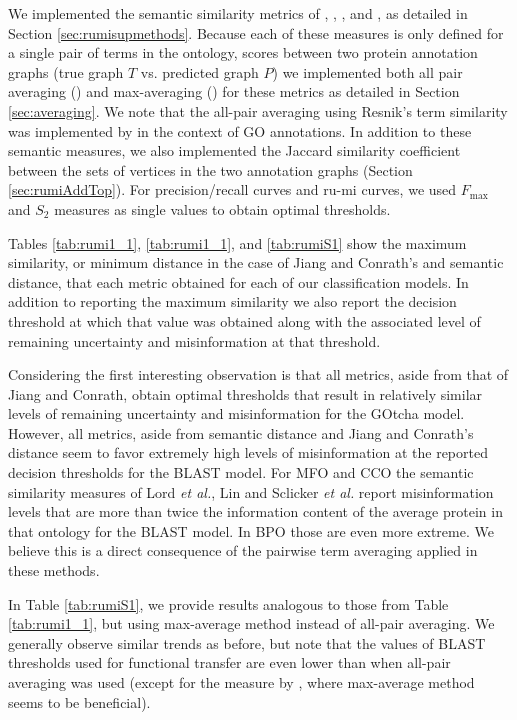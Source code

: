 We implemented the semantic similarity metrics of \cite{Resnik1995}, \cite{Jiang1997}, \cite{Lin1998}, and \cite{Schlicker2006}, as detailed in Section \ref{sec:rumisupmethods}. Because each of these measures is only defined for a single pair of terms in the ontology, scores between two protein annotation graphs (true graph $T$ vs. predicted graph $P$) we implemented both all pair averaging () and max-averaging () for these metrics as detailed in Section \ref{sec:averaging}. We note that the all-pair averaging using Resnik's term similarity was implemented by \citet{Lord2003} in the context of GO annotations. In addition to these semantic measures, we also implemented the Jaccard similarity coefficient between the sets of vertices in the two annotation graphs (Section \ref{sec:rumiAddTop}). For precision/recall curves and ru-mi curves, we used $F_{\max}$ and $S_{2}$ measures as single values to obtain optimal thresholds.

Tables \ref{tab:rumi1_1}, \ref{tab:rumi1_1}, and \ref{tab:rumiS1} show the maximum similarity, or minimum distance in the case of Jiang and Conrath's and semantic distance, that each metric obtained for each of our classification models. In addition to reporting the maximum similarity we also report the decision threshold at which that value was obtained along with the associated level of remaining uncertainty and misinformation at that threshold. 

Considering  the first interesting observation is that all metrics, aside from that of Jiang and Conrath, obtain optimal thresholds that result in relatively similar levels of remaining uncertainty and misinformation for the GOtcha model. However, all metrics, aside from semantic distance and Jiang and Conrath's distance seem to favor extremely high levels of misinformation at the reported decision thresholds for the BLAST model. For MFO and CCO the semantic similarity measures of Lord \emph{et al.}, Lin and Sclicker \emph{et al.} report misinformation levels that are more than twice the information content of the average protein in that ontology for the BLAST model. In BPO those are even more extreme. We believe this is a direct consequence of the pairwise term averaging applied in these methods.

In Table \ref{tab:rumiS1}, we provide results analogous to those from Table \ref{tab:rumi1_1}, but using max-average method instead of all-pair averaging. We generally observe similar trends as before, but note that the values of BLAST thresholds used for functional transfer are even lower than when all-pair averaging was used (except for the measure by \citealt{Jiang1997}, where max-average method seems to be beneficial). 

